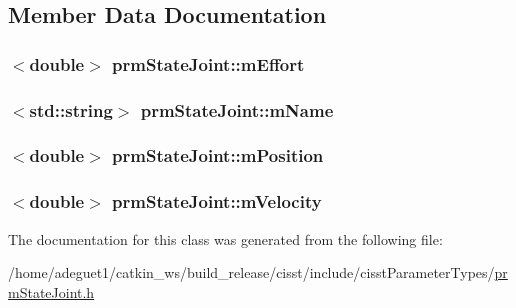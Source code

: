 \subsection{Member Data Documentation}
\hypertarget{classprm_state_joint_a9b3a309dd01a0b23284f9b7fd0be40f8}{
\subsubsection[{m\-Effort}]{$<$double$>$ prm\-State\-Joint\-::m\-Effort\hspace{0.3cm}{\ttfamily [protected]}}}\label{classprm_state_joint_a9b3a309dd01a0b23284f9b7fd0be40f8}
\hypertarget{classprm_state_joint_af2b508570a499e28c0f0b1b053a4a2a9}{
\subsubsection[{m\-Name}]{$<$std\-::string$>$ prm\-State\-Joint\-::m\-Name\hspace{0.3cm}{\ttfamily [protected]}}}\label{classprm_state_joint_af2b508570a499e28c0f0b1b053a4a2a9}
\hypertarget{classprm_state_joint_a972eaf819d71ce20ea31fdfb89e5cfe1}{
\subsubsection[{m\-Position}]{$<$double$>$ prm\-State\-Joint\-::m\-Position\hspace{0.3cm}{\ttfamily [protected]}}}\label{classprm_state_joint_a972eaf819d71ce20ea31fdfb89e5cfe1}
\hypertarget{classprm_state_joint_a43b15bb52cfb414b66ff36dfbef22a42}{
\subsubsection[{m\-Velocity}]{$<$double$>$ prm\-State\-Joint\-::m\-Velocity\hspace{0.3cm}{\ttfamily [protected]}}}\label{classprm_state_joint_a43b15bb52cfb414b66ff36dfbef22a42}


The documentation for this class was generated from the following file\-:\begin{DoxyCompactItemize}
\item 
/home/adeguet1/catkin\-\_\-ws/build\-\_\-release/cisst/include/cisst\-Parameter\-Types/\hyperlink{prm_state_joint_8h}{prm\-State\-Joint.\-h}\end{DoxyCompactItemize}
